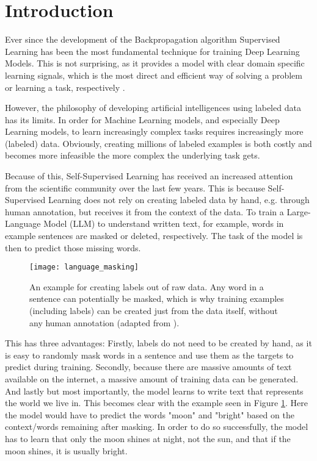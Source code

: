 \section{Introduction}
Ever since the development of the Backpropagation
algorithm Supervised Learning has been the most fundamental technique for
training Deep Learning Models. This is not surprising, as it provides a model with clear domain specific
learning signals, which is the most direct and efficient way of solving a problem
or learning a task, respectively \cite{geron}.

However, the philosophy of developing artificial intelligences using labeled
data has its limits. In order for Machine Learning models, and especially Deep Learning models, 
to learn increasingly complex tasks requires increasingly more (labeled) data.
Obviously, creating millions of labeled examples is both costly and becomes more infeasible
the more complex the underlying task gets.

Because of this, Self-Supervised Learning has received an increased attention from the scientific
community over the last few years. This is because Self-Supervised Learning does not
rely on creating labeled data by hand, e.g. through human annotation, but receives it
from the context of the data. To train a Large-Language Model (LLM) to understand 
written text, for example, words in example sentences are masked or
deleted, respectively. The task of the model is then to predict those missing words.


\begin{figure}[htbp]
	\texttt{[image: language\_masking]}
	\centering
    \label{language_masking}
	\caption{An example for creating labels out of raw data. Any word in a sentence can
    potentially be masked, which is why training examples (including labels) can be created
    just from the data itself, without any human annotation (adapted from \cite{lecun}).}
\end{figure}

This has three advantages: Firstly, labels do not need to be created by hand, as it is easy
to randomly mask words in a sentence and use them as the targets to predict during training.
Secondly, because there are massive amounts of text available on the internet, a massive amount of training
data can be generated.
And lastly but most importantly, the model learns to write text that represents the world we live in.
This becomes clear with the example seen in Figure \ref{language_masking}.
Here the model would have to predict the words "moon" and "bright" based on the context/words
remaining after masking. In order to do so successfully, the model has to learn that only the moon shines at night, not the
sun, and that if the moon shines, it is usually bright.

